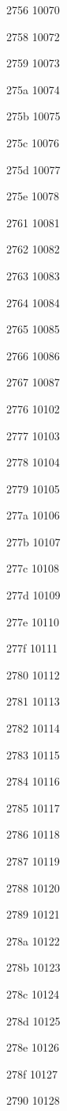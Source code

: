 \documentclass[11pt]{article}
\begin{document}
2756 10070 

2758 10072 

2759 10073 

275a 10074 

275b 10075 

275c 10076 

275d 10077 

275e 10078 

2761 10081 

2762 10082 

2763 10083 

2764 10084 

2765 10085 

2766 10086 

2767 10087 

2776 10102 

2777 10103 

2778 10104 

2779 10105 

277a 10106 

277b 10107 

277c 10108 

277d 10109 

277e 10110 

277f 10111 

2780 10112 

2781 10113 

2782 10114 

2783 10115 

2784 10116 

2785 10117 

2786 10118 

2787 10119 

2788 10120 

2789 10121 

278a 10122 

278b 10123 

278c 10124 

278d 10125 

278e 10126 

278f 10127 

2790 10128 
\end{document}
